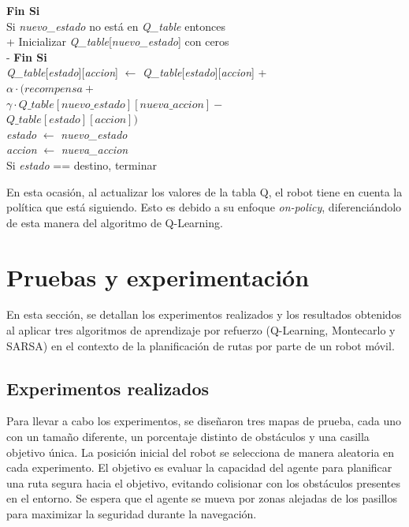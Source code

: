 \documentclass[conference,a4paper]{IEEEtran}
\begin{document}
  \begin{minipage}{\linewidth}
  \begin{pseudo}
  \textbf{Fin Si} \\
  Si \textit{nuevo\_estado} \textnormal{no está en} \textit{Q\_table} entonces \\+
    Inicializar \textit{Q\_table}[\textit{nuevo\_estado}] con ceros \\-
  \textbf{Fin Si} \\
  \textit{Q\_table}[\textit{estado}][\textit{accion}] $\leftarrow$ \textit{Q\_table}[\textit{estado}][\textit{accion}] + \\
  \> $\alpha \cdot (\textit{recompensa} + $ \\
  \> $\gamma \cdot \textit{Q\_table}[\textit{nuevo\_estado}][\textit{nueva\_accion}] -$ \\
  \> $\textit{Q\_table}[\textit{estado}][\textit{accion}])$ \\
  \> \textit{estado} $\leftarrow$ \textit{nuevo\_estado} \\
  \> \textit{accion} $\leftarrow$ \textit{nueva\_accion} \\
  \> Si \textit{estado} == destino, terminar \\
  \end{pseudo}
  \end{minipage}\newline
  En esta ocasión, al actualizar los valores de la tabla Q, el robot tiene en cuenta la política que está siguiendo. Esto es debido a su enfoque \textit{on-policy}, diferenciándolo de esta manera del algoritmo de Q-Learning.\newline



\section{Pruebas y experimentación}
En esta sección, se detallan los experimentos realizados y los resultados obtenidos al aplicar tres algoritmos de aprendizaje por refuerzo (Q-Learning, Montecarlo y SARSA) 
en el contexto de la planificación de rutas por parte de un robot móvil.

\subsection{Experimentos realizados}

Para llevar a cabo los experimentos, se diseñaron tres mapas de prueba, cada uno con un tamaño diferente, un porcentaje distinto de obstáculos y 
una casilla objetivo única. La posición inicial del robot se selecciona de manera aleatoria en cada experimento. 
El objetivo es evaluar la capacidad del agente para planificar una ruta segura hacia el objetivo, evitando colisionar con los obstáculos presentes en el entorno. 
Se espera que el agente se mueva por zonas alejadas de los pasillos para maximizar la seguridad durante la navegación.\newline
\end{document}
